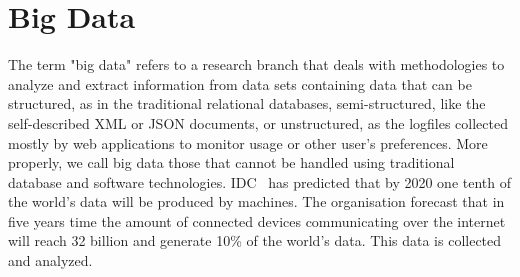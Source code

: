 \section{Big Data}\label{sec:big_data}
The term "big data" refers to a  research branch that deals with methodologies to analyze and extract information from data sets containing data that can be structured, as in the traditional relational databases, semi-structured, like the self-described XML or JSON documents, or unstructured, as the logfiles collected mostly by web applications to monitor usage or other user's preferences. More properly, we call big data those that cannot be handled using traditional database and software technologies. 
IDC~\cite{misc:IDC} has predicted that by 2020 one tenth of the world’s data will be produced by machines. The organisation forecast that in five years time the amount of connected devices communicating over the internet will reach 32 billion and generate 10\% of the world’s data.
This data is collected and analyzed. 

